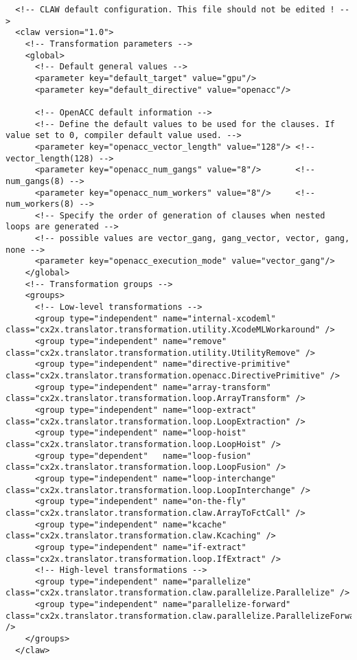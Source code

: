 \documentclass{article}
\begin{document}
\begin{lstlisting}
  <!-- CLAW default configuration. This file should not be edited ! -->
  <claw version="1.0">
    <!-- Transformation parameters -->
    <global>
      <!-- Default general values -->
      <parameter key="default_target" value="gpu"/>
      <parameter key="default_directive" value="openacc"/>

      <!-- OpenACC default information -->
      <!-- Define the default values to be used for the clauses. If value set to 0, compiler default value used. -->
      <parameter key="openacc_vector_length" value="128"/> <!-- vector_length(128) -->
      <parameter key="openacc_num_gangs" value="8"/>       <!-- num_gangs(8) -->
      <parameter key="openacc_num_workers" value="8"/>     <!-- num_workers(8) -->
      <!-- Specify the order of generation of clauses when nested loops are generated -->
      <!-- possible values are vector_gang, gang_vector, vector, gang, none -->
      <parameter key="openacc_execution_mode" value="vector_gang"/>
    </global>
    <!-- Transformation groups -->
    <groups>
      <!-- Low-level transformations -->
      <group type="independent" name="internal-xcodeml"    class="cx2x.translator.transformation.utility.XcodeMLWorkaround" />
      <group type="independent" name="remove"              class="cx2x.translator.transformation.utility.UtilityRemove" />
      <group type="independent" name="directive-primitive"           class="cx2x.translator.transformation.openacc.DirectivePrimitive" />
      <group type="independent" name="array-transform"     class="cx2x.translator.transformation.loop.ArrayTransform" />
      <group type="independent" name="loop-extract"        class="cx2x.translator.transformation.loop.LoopExtraction" />
      <group type="independent" name="loop-hoist"          class="cx2x.translator.transformation.loop.LoopHoist" />
      <group type="dependent"   name="loop-fusion"         class="cx2x.translator.transformation.loop.LoopFusion" />
      <group type="independent" name="loop-interchange"    class="cx2x.translator.transformation.loop.LoopInterchange" />
      <group type="independent" name="on-the-fly"          class="cx2x.translator.transformation.claw.ArrayToFctCall" />
      <group type="independent" name="kcache"              class="cx2x.translator.transformation.claw.Kcaching" />
      <group type="independent" name="if-extract"          class="cx2x.translator.transformation.loop.IfExtract" />
      <!-- High-level transformations -->
      <group type="independent" name="parallelize"         class="cx2x.translator.transformation.claw.parallelize.Parallelize" />
      <group type="independent" name="parallelize-forward" class="cx2x.translator.transformation.claw.parallelize.ParallelizeForward" />
    </groups>
  </claw>
\end{lstlisting}
\end{document}
